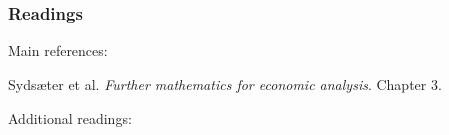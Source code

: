 \documentclass[10pt]{beamer}
\theoremstyle{definition}
\begin{document}
\begin{frame}[fragile]
\frametitle{}

\end{frame}

\section*{}
\begin{frame}[fragile]
\frametitle{Readings}
Main references:

Syds\ae{}ter et al. \emph{Further mathematics for economic analysis}. Chapter 3.\bigskip

Additional readings:
\end{frame}
\end{document}
